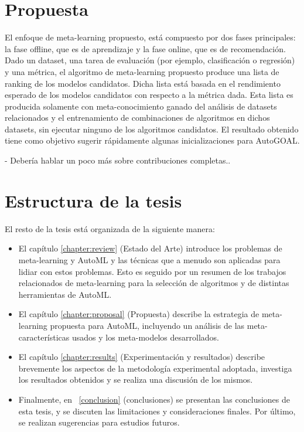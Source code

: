 \section*{Propuesta}

El enfoque de meta-learning propuesto, está compuesto por dos fases principales: la fase offline, que es de aprendizaje y la fase online, que es de recomendación. Dado un dataset, una tarea de evaluación (por ejemplo, clasificación o regresión) y una métrica, el algoritmo de meta-learning propuesto produce una lista de ranking de los modelos candidatos. Dicha lista está basada en el rendimiento esperado de los modelos candidatos con respecto a la métrica dada. Esta lista es producida solamente con meta-conocimiento ganado del análisis de datasets relacionados y el entrenamiento de combinaciones de algoritmos en dichos datasets, sin ejecutar ninguno de los algoritmos candidatos. El resultado obtenido tiene como objetivo sugerir rápidamente algunas inicializaciones para AutoGOAL.

- Debería hablar un poco más sobre contribuciones completas..

\section*{Estructura de la tesis}

El resto de la tesis está organizada de la siguiente manera:

\begin{itemize}
	\item El capítulo \ref{chapter:review} (Estado del Arte) introduce los problemas de meta-learning y AutoML y las técnicas que a menudo son aplicadas para lidiar con estos problemas. Esto es seguido por un resumen de los trabajos relacionados de meta-learning para la selección de algoritmos y de distintas herramientas de AutoML.
	\item El capítulo \ref{chapter:proposal} (Propuesta) describe la estrategia de meta-learning propuesta para AutoML, incluyendo un análisis de las meta-características usados y los meta-modelos desarrollados.
	\item El capítulo \ref{chapter:results} (Experimentación y resultados) describe brevemente los aspectos de la metodología experimental adoptada, investiga los resultados obtenidos y se realiza una discusión de los mismos.
	\item Finalmente, en ~\ref{conclusion} (conclusiones) se presentan las conclusiones de esta tesis, y se discuten las limitaciones y consideraciones finales. Por último, se realizan sugerencias para estudios futuros.
\end{itemize}